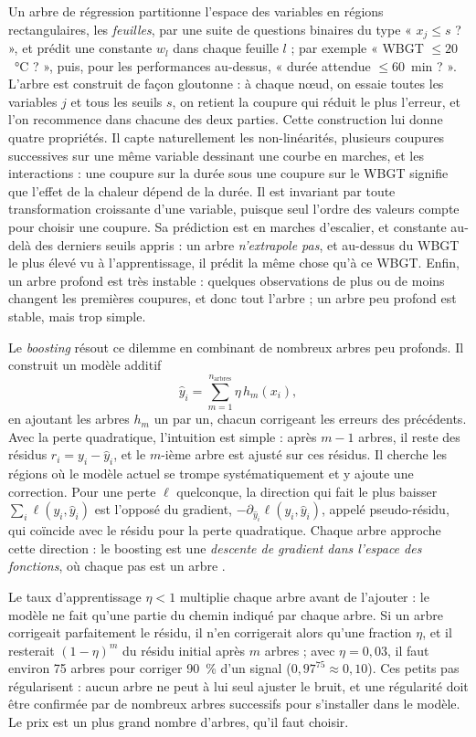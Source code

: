 \documentclass[11pt,a4paper]{article}
\begin{document}
Un arbre de régression partitionne l'espace des variables en régions rectangulaires, les \emph{feuilles}, par une
suite de questions binaires du type « $x_j \leq s$ ? », et prédit une constante $w_l$ dans chaque feuille $l$ ; par
exemple « WBGT $\le 20$~°C ? », puis, pour les performances au-dessus, « durée attendue $\le 60$~min ? ». L'arbre est
construit de façon gloutonne : à chaque nœud, on essaie toutes les variables $j$ et tous les seuils $s$, on retient la
coupure qui réduit le plus l'erreur, et l'on recommence dans chacune des deux parties. Cette construction lui donne
quatre propriétés. Il capte naturellement les non-linéarités, plusieurs coupures successives sur une même variable
dessinant une courbe en marches, et les interactions : une coupure sur la durée sous une coupure sur le WBGT signifie
que l'effet de la chaleur dépend de la durée. Il est invariant par toute transformation croissante d'une variable,
puisque seul l'ordre des valeurs compte pour choisir une coupure. Sa prédiction est en marches d'escalier, et
constante au-delà des derniers seuils appris : un arbre \emph{n'extrapole pas}, et au-dessus du WBGT le plus élevé vu
à l'apprentissage, il prédit la même chose qu'à ce WBGT. Enfin, un arbre profond est très instable : quelques
observations de plus ou de moins changent les premières coupures, et donc tout l'arbre ; un arbre peu profond est
stable, mais trop simple.

Le \emph{boosting} résout ce dilemme en combinant de nombreux arbres peu profonds. Il construit un modèle additif
\[
\hat y_i = \sum_{m=1}^{n_{\text{arbres}}} \eta\, h_m(x_i),
\]
en ajoutant les arbres $h_m$ un par un, chacun corrigeant les erreurs des précédents. Avec la perte quadratique,
l'intuition est simple : après $m - 1$ arbres, il reste des résidus $r_i = y_i - \hat y_i$, et le $m$-ième arbre est
ajusté sur ces résidus. Il cherche les régions où le modèle actuel se trompe systématiquement et y ajoute une
correction. Pour une perte $\ell$ quelconque, la direction qui fait le plus baisser $\sum_i \ell(y_i, \hat y_i)$ est
l'opposé du gradient, $-\partial_{\hat y_i}\ell(y_i, \hat y_i)$, appelé pseudo-résidu, qui coïncide avec le résidu
pour la perte quadratique. Chaque arbre approche cette direction : le boosting est une \emph{descente de gradient
dans l'espace des fonctions}, où chaque pas est un arbre \citep{friedman2001}.

Le taux d'apprentissage $\eta < 1$ multiplie chaque arbre avant de l'ajouter : le modèle ne fait qu'une partie du
chemin indiqué par chaque arbre. Si un arbre corrigeait parfaitement le résidu, il n'en corrigerait alors qu'une
fraction $\eta$, et il resterait $(1 - \eta)^m$ du résidu initial après $m$ arbres ; avec $\eta = 0{,}03$, il faut
environ 75 arbres pour corriger 90~\% d'un signal ($0{,}97^{75} \approx 0{,}10$). Ces petits pas régularisent : aucun
arbre ne peut à lui seul ajuster le bruit, et une régularité doit être confirmée par de nombreux arbres successifs
pour s'installer dans le modèle. Le prix est un plus grand nombre d'arbres, qu'il faut choisir.
\end{document}
